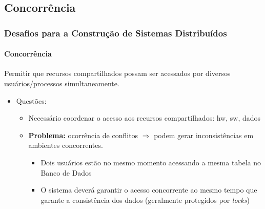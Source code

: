 \documentclass[hyperref={pdfpagelabels=false},table]{beamer}
\begin{document}
\subsection{Concorrência}

\begin{frame}
    \frametitle{Desafios para a Construção de Sistemas Distribuídos}
    \framesubtitle{Concorrência}

    \begin{block}{}
	   Permitir que recursos compartilhados possam ser acessados por diversos usuários/processos \alert{simultaneamente}.
    \end{block}	
	
    \begin{itemize}
	\item Questões:
	\begin{itemize}
	    \item Necessário coordenar o acesso aos recursos compartilhados: hw, sw, dados

	    \item \textbf{Problema:} ocorrência de conflitos $\Longrightarrow$ podem gerar inconsistências em ambientes concorrentes. 
	    \begin{itemize}
		\item Dois usuários estão no mesmo momento acessando a mesma tabela no Banco de Dados
		\item O sistema deverá garantir o acesso concorrente ao mesmo tempo que garante a consistência dos dados (geralmente protegidos por \textit{locks}) 
	    \end{itemize}
	\end{itemize}
    \end{itemize}
\end{frame}
\end{document}
